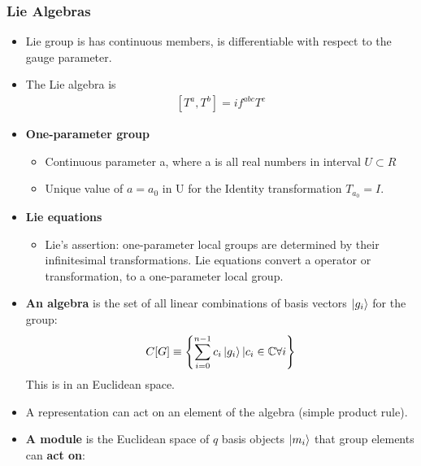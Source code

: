 \subsubsection{Lie Algebras}
\begin{itemize}
        \item Lie group is has continuous members, is differentiable with respect to the gauge parameter. \cite{wells}
        \item The Lie algebra is \cite{wells}
        \begin{equation}\begin{split}
        [T^a,T^b]=if^{abc}T^c
        \end{split}\end{equation}
    \item \textbf{One-parameter group} \cite{ibragimov}
    \begin{itemize}
        \item Continuous parameter a, where a is all real numbers in interval $U\subset R$ \cite{ibragimov}
        \item Unique value of $a=a_0$ in U for the Identity transformation $T_{a_0}=I$. \cite{ibragimov}
    \end{itemize}
    \item \textbf{Lie equations} \cite{ibragimov}
    \begin{itemize}
        \item Lie's assertion: one-parameter local groups are determined by their infinitesimal transformations. Lie equations convert a operator or transformation, to a one-parameter local group. \cite{ibragimov}
    \end{itemize}
    \item \textbf{An algebra} is the set of all linear combinations of basis vectors $\ket{g_i}$ for the group: \cite{robinson}
    \begin{equation}\begin{split}
    C[G]\equiv\left\{\sum_{i=0}^{n-1}c_i\ket{g_i}\vert c_i\in \mathbb{C} \forall i\right\}
    \end{split}\end{equation}
    This is in an Euclidean space.
    \item A representation can act on an element of the algebra (simple product rule). \cite{robinson}
    \item \textbf{A module} is the Euclidean space of $q$ basis objects $\ket{m_i}$ that group elements can \textbf{act on}: \cite{robinson}
    \begin{equation}\begin{split}

\end{split}
\end{equation}
\end{itemize}
